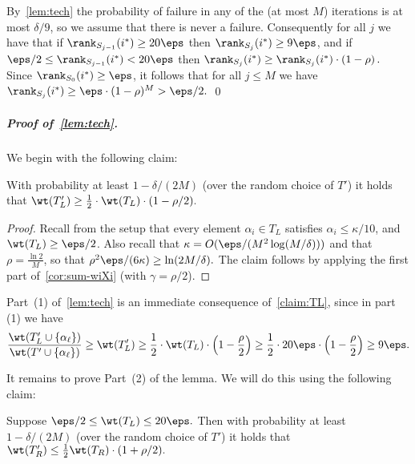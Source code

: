 By~\cref{lem:tech} the probability of failure in any of the (at most $M$)
iterations is at most $\delta/9$, so we assume that there is never a
failure.  Consequently for all $j$ we have that if
$\rank_{S_{j-1}}(i^\ast) \geq 20 \eps$
then
$\rank_{S_{j}}(i^\ast) \geq {9\eps}$, and if
$\eps/2 \leq \rank_{S_{j-1}}(i^\ast) < 20 \eps$
then
$\rank_{S_{j}}(i^\ast) \geq \rank_{S_{j}}(i^\ast) \cdot \left(1-\rho\right).$
Since $\rank_{S_{0}}(i^\ast) \geq \eps$,
it follows that for all $j \leq M$ we have $\rank_{S_{j}}(i^\ast)
\geq \eps \cdot (1 - \rho)^M > \eps/2.$
\qed

\subparagraph{Proof of~\cref{lem:tech}.}
We begin with the following claim:

\begin{claim} \label{claim:TL}
With probability at least $1-\delta/{(2M)}$ (over the random choice of $T'$)
it holds that
$\wt(T'_L) \geq {\frac{1}2} \cdot \wt(T_L) \cdot (1-\rho/2).$
\end{claim}

\begin{proof}
Recall from the setup that every element $\alpha_i \in T_L$ satisfies $\alpha_i \leq \kappa/10$,
and $\wt(T_L) \geq \eps/2$. Also recall that 
$\kappa = O(\eps/(M^2 \log(M/\delta)))$ 
and that
$\rho = {\frac {\ln 2}{M}}$, so that $\rho^2\eps/(6\kappa) \geq \ln (2M/\delta).$
The claim follows by applying the first part of~\cref{cor:sum-wiXi} (with $\gamma = \rho/2$).
\end{proof}

Part~(1) of~\cref{lem:tech} is an immediate
consequence of~\cref{claim:TL}, since in part (1) we have
\[
{\frac {\wt(T'_L \cup \{\alpha_\ell\})}
       {\wt(T' \cup \{\alpha_\ell\})}} \geq \wt(T'_L) \geq
{\frac{1}2} \cdot \wt(T_L) \cdot \left(1-\frac{\rho}{2}\right) \geq
{\frac{1}2} \cdot 20 \eps \cdot \left(1 - {\frac \rho 2}\right) \geq 9 \eps.
\]

It remains to prove Part~(2) of the lemma.  We will do this using the
following claim:

\begin{claim} \label{claim:TR}
Suppose $\eps/2 \leq \wt(T_L) \leq 20 \eps.$  Then with probability
at least $1-\delta/(2M)$ (over the random choice of $T'$)
it holds that
$\wt(T'_R) \leq {\frac{1}2} \wt(T_R) \cdot (1 + \rho/2).$
\end{claim}

